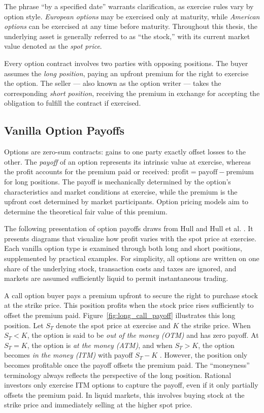 \documentclass[english,12pt,a4paper,pdftex,sci,utf8]{aaltothesis}
\begin{document}
The phrase ``by a specified date'' warrants clarification, as exercise rules vary by option style. \emph{European options} may be exercised only at maturity, while \emph{American options} can be exercised at any time before maturity. Throughout this thesis, the underlying asset is generally referred to as ``the stock,'' with its current market value denoted as the \emph{spot price}.

Every option contract involves two parties with opposing positions. The buyer assumes the \emph{long position}, paying an upfront premium for the right to exercise the option. The seller --- also known as the option writer --- takes the corresponding \emph{short position}, receiving the premium in exchange for accepting the obligation to fulfill the contract if exercised.

\clearpage
\subsection{Vanilla Option Payoffs}\label{subsec:payoffs}

Options are zero-sum contracts: gains to one party exactly offset losses to the other. The \emph{payoff} of an option represents its intrinsic value at exercise, whereas the profit accounts for the premium paid or received: \mbox{$\text{profit} = \text{payoff} - \text{premium}$} for long positions. The payoff is mechanically determined by the option's characteristics and market conditions at exercise, while the premium is the upfront cost determined by market participants. Option pricing models aim to determine the theoretical fair value of this premium.

The following presentation of option payoffs draws from Hull \cite{hull2016options} and Hull et al. \cite{hull2013fundamentals}. It presents diagrams that visualize how profit varies with the spot price at exercise. Each vanilla option type is examined through both long and short positions, supplemented by practical examples. For simplicity, all options are written on one share of the underlying stock, transaction costs and taxes are ignored, and markets are assumed sufficiently liquid to permit instantaneous trading.

A call option buyer pays a premium upfront to secure the right to purchase stock at the strike price. This position profits when the stock price rises sufficiently to offset the premium paid. Figure~\ref{fig:long_call_payoff} illustrates this long position. Let $S_T$ denote the spot price at exercise and $K$ the strike price. When $S_T < K$, the option is said to be \emph{out of the money (OTM)} and has zero payoff. At $S_T = K$, the option is \emph{at the money (ATM)}, and when $S_T > K$, the option becomes \emph{in the money (ITM)} with payoff $S_T - K$ \cite{hull2013fundamentals}. However, the position only becomes profitable once the payoff offsets the premium paid. The ``moneyness'' terminology always reflects the perspective of the long position. Rational investors only exercise ITM options to capture the payoff, even if it only partially offsets the premium paid. In liquid markets, this involves buying stock at the strike price and immediately selling at the higher spot price.
\end{document}
